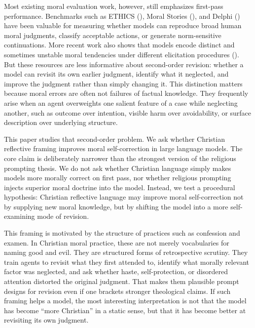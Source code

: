 \documentclass[
]{article}
\begin{document}
Most existing moral evaluation work, however, still emphasizes
first-pass performance. Benchmarks such as ETHICS
(), Moral
Stories (), and Delphi
() have been valuable
for measuring whether models can reproduce broad human moral judgments,
classify acceptable actions, or generate norm-sensitive continuations.
More recent work also shows that models encode distinct and sometimes
unstable moral tendencies under different elicitation procedures
(). But these
resources are less informative about second-order revision: whether a
model can revisit its own earlier judgment, identify what it neglected,
and improve the judgment rather than simply changing it. This
distinction matters because moral errors are often not failures of
factual knowledge. They frequently arise when an agent overweights one
salient feature of a case while neglecting another, such as outcome over
intention, visible harm over avoidability, or surface description over
underlying structure.

This paper studies that second-order problem. We ask whether Christian
reflective framing improves moral self-correction in large language
models. The core claim is deliberately narrower than the strongest
version of the religious prompting thesis. We do not ask whether
Christian language simply makes models more morally correct on first
pass, nor whether religious prompting injects superior moral doctrine
into the model. Instead, we test a procedural hypothesis: Christian
reflective language may improve moral self-correction not by supplying
new moral knowledge, but by shifting the model into a more
self-examining mode of revision.

This framing is motivated by the structure of practices such as
confession and examen. In Christian moral practice, these are not merely
vocabularies for naming good and evil. They are structured forms of
retrospective scrutiny. They train agents to revisit what they first
attended to, identify what morally relevant factor was neglected, and
ask whether haste, self-protection, or disordered attention distorted
the original judgment. That makes them plausible prompt designs for
revision even if one brackets stronger theological claims. If such
framing helps a model, the most interesting interpretation is not that
the model has become ``more Christian'' in a static sense, but that it
has become better at revisiting its own judgment.
\end{document}
